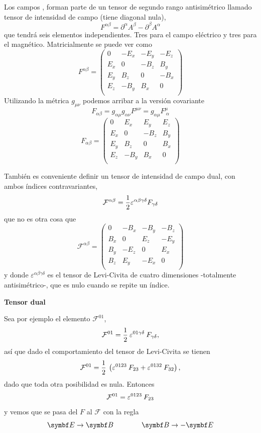 \documentclass[10pt,oneside]{CBFT_book}
\begin{document}
Los campos ,  forman parte de un tensor de segundo rango antisimétrico llamado tensor
de intensidad de campo (tiene diagonal nula),
\[
	F^{\alpha\beta} = \partial^\alpha A^\beta - \partial^\beta A^\alpha
\]
que tendrá seis elementos independientes. Tres para el campo eléctrico y tres para el magnético.
Matricialmente se puede ver como 
\[
	F^{\alpha\beta} =
	\begin{pmatrix}
	 0 & -E_x & -E_y & -E_z \\
	 E_x & 0 & -B_z & B_y \\
	 E_y & B_z & 0 & -B_x \\
	 E_z & -B_y & B_x & 0 \\
	\end{pmatrix}
\]
Utilizando la métrica $g_{\mu\nu}$ podemos arribar a la versión covariante
\[
	F_{\alpha\beta} = g_{{\alpha\mu}} g_{{\alpha\nu}} F^{\mu\nu} 
	= g_{{\alpha\mu}} F^{\mu}_{\ \alpha}
\]
\[
	F_{\alpha\beta} =
	\begin{pmatrix}
	 0 & E_x & E_y & E_z \\
	 E_x & 0 & -B_z & B_y \\
	 E_y & B_z & 0 & B_x \\
	 E_z & -B_y & B_x & 0 \\
	\end{pmatrix}
\]

También es conveniente definir un tensor de intensidad de campo dual,
con ambos índices contravariantes,
\[
	\mathcal{F}^{\alpha\beta} =  \frac{1}{2} 
	\varepsilon^{\alpha\beta\gamma\delta} F_{\gamma\delta}
\]
que no es otra cosa que 
\[
	\mathcal{F}^{\alpha\beta}=
	\begin{pmatrix}
	 0 & -B_x & -B_y & -B_z \\
	 B_x & 0 & E_z & -E_y \\
	 B_y & -E_z & 0 & E_x \\
	 B_z & E_y & -E_x & 0 \\
	\end{pmatrix}
\]
y donde $\varepsilon^{\alpha\beta\gamma\delta}$ es el tensor de Levi-Civita 
de cuatro dimensiones -totalmente antisimétrico-, que es nulo cuando se repite un índice.

\begin{ejemplo}{\bf Tensor dual}

Sea por ejemplo el elemento $\mathcal{F}^{01}$,
\[
	\mathcal{F}^{01} = \frac{1}{2} \: \varepsilon^{01\gamma\delta} \: F_{\gamma\delta},
\]
así que dado el comportamiento del tensor de Levi-Civita se tienen
\[
	\mathcal{F}^{01} = \frac{1}{2} \: \left( 
	\varepsilon^{ 0123} \: F_{23} +
	\varepsilon^{ 0132} \: F_{32}
	\right),
\]
dado que toda otra posibilidad es nula. Entonces
\[
	\mathcal{F}^{01} = \varepsilon^{ 0123}  \: F_{23}
\]
y vemos que se pasa del $F$ al $\mathcal{F}$ con la regla
\[
	\vb{E}\to\vb{B} \qquad \qquad \vb{B}\to -\vb{E}
\]
\end{ejemplo}
\end{document}
